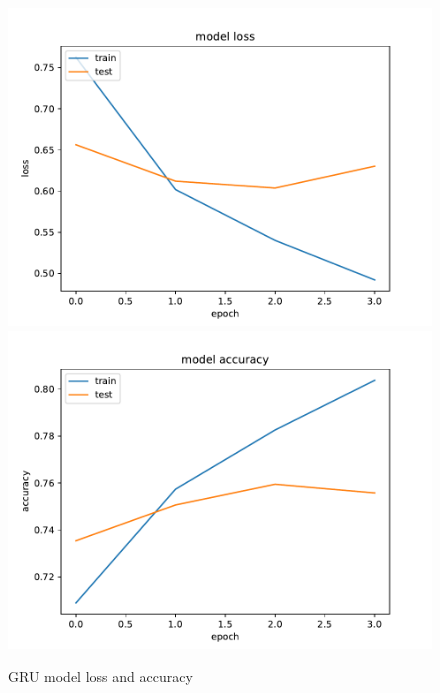 \documentclass[12pt]{article}
\begin{document}
\begin{figure}[h!]
    \centering
    \includegraphics{gru_loss.pdf}
    \includegraphics{gru_accuracy.pdf}
    \caption{GRU model loss and accuracy}
    \label{fig:gru}
\end{figure}
\medskip
\end{document}
